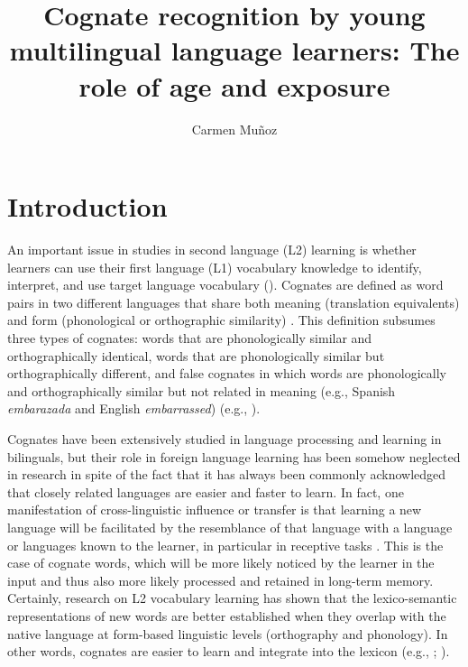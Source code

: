 \documentclass[output=paper,modfonts,nonflat,newtxmath]{langsci/langscibook}
\author{Carmen Muñoz\affiliation{Universitat de Barcelona}}
\title{{Cognate} {recognition} {by} {young} {multilingual} {language} {learners}: {The} {role} {of} {age} {and} {exposure}}
\begin{document}
\maketitle

\section{Introduction}

An important issue in studies in second language (L2) learning is whether learners can use their first language (L1) vocabulary knowledge to identify, interpret, and use target language vocabulary (\citealt{MendezPerezEtAl2010}). Cognates are defined as word pairs in two different languages that share both meaning (translation equivalents) and form (phonological or orthographic similarity) \citep{KohnertEtAl2004}. This definition subsumes three types of cognates: words that are phonologically similar and orthographically identical, words that are phonologically similar but orthographically different, and false cognates in which words are phonologically and orthographically similar but not related in meaning (e.g., Spanish \textit{embarazada} and English \textit{embarrassed}) (e.g., \citealt{Rodriguez2001}).

Cognates have been extensively studied in language processing and learning in bilinguals, but their role in foreign language learning has been somehow neglected in research in spite of the fact that it has always been commonly acknowledged that closely related languages are easier and faster to learn. In fact, one manifestation of cross-linguistic influence or transfer is that learning a new language will be facilitated by the resemblance of that language with a language or languages known to the learner, in particular in receptive tasks \citep{Ringbom2007}. This is the case of cognate words, which will be more likely noticed by the learner in the input and thus also more likely processed and retained in long-term memory. Certainly, research on L2 vocabulary learning has shown that the lexico-semantic representations of new words are better established when they overlap with the native language at form-based linguistic levels (orthography and phonology). In other words, cognates are easier to learn and integrate into the lexicon (e.g., \citealt{EllisNBeaton1993}; \citealt{DeGrootvanHell2005}).
\end{document}
